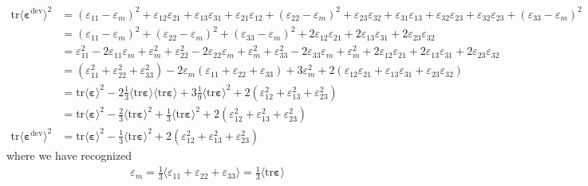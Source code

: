 \documentclass[12pt,3p]{article}
\numberwithin{equation}{section}
\begin{document}
\begin{align*}
\mathrm{tr} \langle \boldsymbol{\varepsilon}^{\mathrm{dev}} \rangle^2 
&= ( \varepsilon_{11} - \varepsilon_m)^2 + \varepsilon_{12} \varepsilon_{21}  + \varepsilon_{13} \varepsilon_{31} + \varepsilon_{21} \varepsilon_{12}  + ( \varepsilon_{22} - \varepsilon_m)^2 +  \varepsilon_{23} \varepsilon_{32}  + \varepsilon_{31} \varepsilon_{13} + \varepsilon_{32} \varepsilon_{23}  +  \varepsilon_{32} \varepsilon_{23} + ( \varepsilon_{33} - \varepsilon_m)^2 \\
&= ( \varepsilon_{11} - \varepsilon_m)^2  + ( \varepsilon_{22} - \varepsilon_m)^2 + (\varepsilon_{33} - \varepsilon_m)^2 + 2 \varepsilon_{12} \varepsilon_{21}  + 2 \varepsilon_{13} \varepsilon_{31} + 2 \varepsilon_{23} \varepsilon_{32} \\
&= 
\varepsilon_{11}^2 - 2 \varepsilon_{11} \varepsilon_{m} + \varepsilon_m^2 
+ \varepsilon_{22}^2 - 2 \varepsilon_{22} \varepsilon_{m} + \varepsilon_m^2 
+ \varepsilon_{33}^2 - 2 \varepsilon_{33} \varepsilon_{m} + \varepsilon_m^2 
+ 2 \varepsilon_{12} \varepsilon_{21}  + 2 \varepsilon_{13} \varepsilon_{31} + 2 \varepsilon_{23} \varepsilon_{32} \\
&= 
(\varepsilon_{11}^2 + \varepsilon_{22}^2 + \varepsilon_{33}^2 )
- 2 \varepsilon_{m} ( \varepsilon_{11}  + \varepsilon_{22} + \varepsilon_{33} ) 
+ 3 \varepsilon_m^2 
+ 2 ( \varepsilon_{12} \varepsilon_{21}  + \varepsilon_{13} \varepsilon_{31} + \varepsilon_{23} \varepsilon_{32})  \\
&= 
\mathrm{tr} \langle \boldsymbol{\varepsilon} \rangle^2 - 2 \frac{1}{3} \langle \mathrm{tr} \boldsymbol{\varepsilon} \rangle  \langle \mathrm{tr} \boldsymbol{\varepsilon} \rangle 
+ 3 \frac{1}{9}  \langle \mathrm{tr} \boldsymbol{\varepsilon} \rangle^2  
+ 2 ( \varepsilon_{12}^2 + \varepsilon_{13}^2 + \varepsilon_{23}^2)  \\
&= 
\mathrm{tr} \langle \boldsymbol{\varepsilon} \rangle^2 - \frac{2}{3} \langle \mathrm{tr} \boldsymbol{\varepsilon} \rangle^2 
+ \frac{1}{3}  \langle \mathrm{tr} \boldsymbol{\varepsilon} \rangle^2  
+ 2 ( \varepsilon_{12}^2 + \varepsilon_{13}^2 + \varepsilon_{23}^2) \\
\mathrm{tr} \langle \boldsymbol{\varepsilon}^{\mathrm{dev}} \rangle^2 &= 
\mathrm{tr} \langle \boldsymbol{\varepsilon} \rangle^2 - \frac{1}{3} \langle \mathrm{tr} \boldsymbol{\varepsilon} \rangle^2 + 2 ( \varepsilon_{12}^2 + \varepsilon_{13}^2 + \varepsilon_{23}^2)  
\end{align*}
where we have recognized
\begin{align*}
\varepsilon_{m} = \frac{1}{3} \langle \varepsilon_{11} + \varepsilon_{22} + \varepsilon_{33} \rangle = \frac{1}{3} \langle \mathrm{tr} \boldsymbol{\varepsilon} \rangle
\end{align*}
\end{document}
